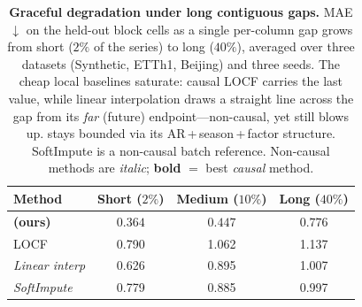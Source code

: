 \begin{table}[t]\centering\small
\setlength{\tabcolsep}{5pt}
\caption{\textbf{Graceful degradation under long contiguous gaps.} MAE $\downarrow$ on the held-out block cells as a single per-column gap grows from short ($2\%$ of the series) to long ($40\%$), averaged over three datasets (Synthetic, ETTh1, Beijing) and three seeds. The cheap local baselines saturate: causal LOCF carries the last value, while linear interpolation draws a straight line across the gap from its \emph{far} (future) endpoint---non-causal, yet still blows up. \cafe{} stays bounded via its AR\,+\,season\,+\,factor structure. SoftImpute is a non-causal batch reference. Non-causal methods are \emph{italic}; \textbf{bold} $=$ best \emph{causal} method.}
\label{tab:longgap}
\begin{tabular}{@{}lccc@{}}
\toprule
Method & Short ($2\%$) & Medium ($10\%$) & Long ($40\%$) \\
\midrule
\textbf{\cafe{} (ours)} & $\mathbf{0.364}$ & $\mathbf{0.447}$ & $\mathbf{0.776}$ \\
LOCF & 0.790 & 1.062 & 1.137 \\
\midrule
\emph{Linear interp} & 0.626 & 0.895 & 1.007 \\
\emph{SoftImpute} & 0.779 & 0.885 & 0.997 \\
\bottomrule
\end{tabular}
\end{table}
